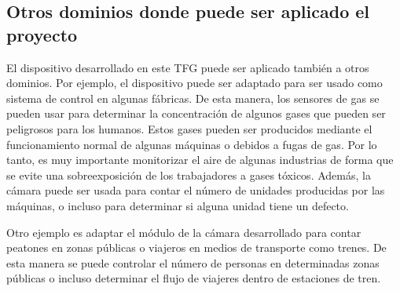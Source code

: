 \subsection{Otros dominios donde puede ser aplicado el proyecto}
El dispositivo desarrollado en este \ac{TFG} puede ser aplicado también a otros dominios. Por ejemplo, el dispositivo puede ser adaptado para ser usado como sistema de control en algunas fábricas. De esta manera, los sensores de gas se pueden usar para determinar la concentración de algunos gases que pueden ser peligrosos para los humanos. Estos gases pueden ser producidos mediante el funcionamiento normal de algunas máquinas o debidos a fugas de gas. Por lo tanto, es muy importante monitorizar el aire de algunas industrias de forma que se evite una sobreexposición de los trabajadores a gases tóxicos. Además, la cámara puede ser usada para contar el número de unidades producidas por las máquinas, o incluso para determinar si alguna unidad tiene un defecto.

Otro ejemplo es adaptar el módulo de la cámara desarrollado para contar peatones en zonas públicas o viajeros en medios de transporte como trenes. De esta manera se puede controlar el número de personas en determinadas zonas públicas o incluso determinar el flujo de viajeres dentro de estaciones de tren.


